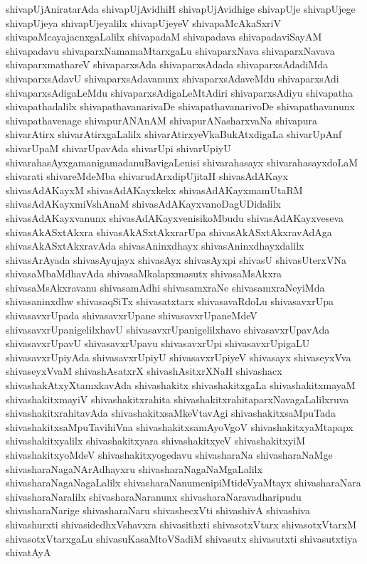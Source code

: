 {shivapUjAniratarAda
shivapUjAvidhiH
shivapUjAvidhige
shivapUje
shivapUjege
shivapUjeya
shivapUjeyalilx
shivapUjeyeV
shivapaMcAkaSxriV
shivapaMcayajacnxgaLalilx
shivapadaM
shivapadava
shivapadaviSayAM
shivapadavu
shivaparxNamamaMtarxgaLu
shivaparxNava
shivaparxNavava
shivaparxmathareV
shivaparxsAda
shivaparxsAdada
shivaparxsAdadiMda
shivaparxsAdavU
shivaparxsAdavanunx
shivaparxsAdaveMdu
shivaparxsAdi
shivaparxsAdigaLeMdu
shivaparxsAdigaLeMtAdiri
shivaparxsAdiyu
shivapatha
shivapathadalilx
shivapathavanarivaDe
shivapathavanarivoDe
shivapathavanunx
shivapathavenage
shivapurANAnAM
shivapurANasharxvaNa
shivapura
shivarAtirx
shivarAtirxgaLalilx
shivarAtirxyeVkaBukAtxdigaLa
shivarUpAnf
shivarUpaM
shivarUpavAda
shivarUpi
shivarUpiyU
shivarahasAyxgamanigamadanuBavigaLenisi
shivarahasayx
shivarahasayxdoLaM
shivarati
shivareMdeMba
shivarudArxdipUjitaH
shivasAdAKayx
shivasAdAKayxM
shivasAdAKayxkekx
shivasAdAKayxmamUtaRM
shivasAdAKayxmiVshAnaM
shivasAdAKayxvanoDagUDidalilx
shivasAdAKayxvanunx
shivasAdAKayxvenisikoMbudu
shivasAdAKayxveseva
shivasAkASxtAkxra
shivasAkASxtAkxrarUpa
shivasAkASxtAkxravAdAga
shivasAkASxtAkxravAda
shivasAninxdhayx
shivasAninxdhayxdalilx
shivasArAyada
shivasAyujayx
shivasAyx
shivasAyxpi
shivasU
shivasUterxVNa
shivasaMbaMdhavAda
shivasaMkalapxmasutx
shivasaMsAkxra
shivasaMsAkxravanu
shivasamAdhi
shivasamxraNe
shivasamxraNeyiMda
shivasaninxdhw
shivasaqSiTx
shivasatxtarx
shivasavaRdoLu
shivasavxrUpa
shivasavxrUpada
shivasavxrUpane
shivasavxrUpaneMdeV
shivasavxrUpanigelilxhavU
shivasavxrUpanigelilxhavo
shivasavxrUpavAda
shivasavxrUpavU
shivasavxrUpavu
shivasavxrUpi
shivasavxrUpigaLU
shivasavxrUpiyAda
shivasavxrUpiyU
shivasavxrUpiyeV
shivasayx
shivaseyxVva
shivaseyxVvaM
shivashAsatxrX
shivashAsitxrXNaH
shivashacx
shivashakAtxyXtamxkavAda
shivashakitx
shivashakitxgaLa
shivashakitxmayaM
shivashakitxmayiV
shivashakitxrahita
shivashakitxrahitaparxNavagaLalilxruva
shivashakitxrahitavAda
shivashakitxsaMkeVtavAgi
shivashakitxsaMpuTada
shivashakitxsaMpuTavihiVna
shivashakitxsamAyoVgoV
shivashakitxyaMtapapx
shivashakitxyalilx
shivashakitxyara
shivashakitxyeV
shivashakitxyiM
shivashakitxyoMdeV
shivashakitxyogedavu
shivasharaNa
shivasharaNaMge
shivasharaNagaNArAdhayxru
shivasharaNagaNaMgaLalilx
shivasharaNagaNagaLalilx
shivasharaNanumenipiMtideVyaMtayx
shivasharaNara
shivasharaNaralilx
shivasharaNaranunx
shivasharaNaravadharipudu
shivasharaNarige
shivasharaNaru
shivashecxVti
shivashivA
shivashiva
shivashurxti
shivasidedhxVshavxra
shivasithxti
shivasotxVtarx
shivasotxVtarxM
shivasotxVtarxgaLu
shivasuKasaMtoVSadiM
shivasutx
shivasutxti
shivasutxtiya
shivatAyA
}
